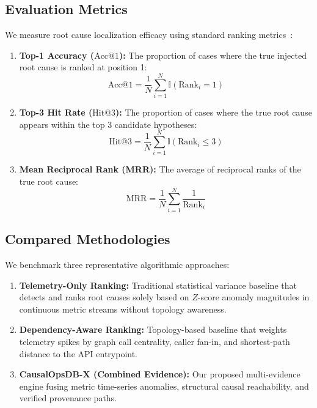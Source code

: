 \documentclass[conference]{IEEEtran}
\begin{document}
\subsection{Evaluation Metrics}
We measure root cause localization efficacy using standard ranking metrics~\cite{su2021microrank,li2022dejavu}:
\begin{enumerate}
    \item \textbf{Top-1 Accuracy ($\text{Acc}@1$):} The proportion of cases where the true injected root cause is ranked at position 1:
    \begin{equation}
    \text{Acc}@1 = \frac{1}{N} \sum_{i=1}^N \mathbb{I}(\text{Rank}_i = 1)
    \end{equation}
    \item \textbf{Top-3 Hit Rate ($\text{Hit}@3$):} The proportion of cases where the true root cause appears within the top 3 candidate hypotheses:
    \begin{equation}
    \text{Hit}@3 = \frac{1}{N} \sum_{i=1}^N \mathbb{I}(\text{Rank}_i \le 3)
    \end{equation}
    \item \textbf{Mean Reciprocal Rank (MRR):} The average of reciprocal ranks of the true root cause:
    \begin{equation}
    \text{MRR} = \frac{1}{N} \sum_{i=1}^N \frac{1}{\text{Rank}_i}
    \end{equation}
\end{enumerate}

\subsection{Compared Methodologies}
We benchmark three representative algorithmic approaches:
\begin{enumerate}
    \item \textbf{Telemetry-Only Ranking:} Traditional statistical variance baseline that detects and ranks root causes solely based on $Z$-score anomaly magnitudes in continuous metric streams without topology awareness.
    \item \textbf{Dependency-Aware Ranking:} Topology-based baseline that weights telemetry spikes by graph call centrality, caller fan-in, and shortest-path distance to the API entrypoint.
    \item \textbf{CausalOpsDB-X (Combined Evidence):} Our proposed multi-evidence engine fusing metric time-series anomalies, structural causal reachability, and verified provenance paths.
\end{enumerate}
\end{document}
